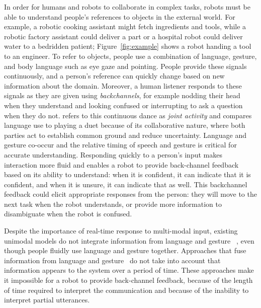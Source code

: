 \documentclass[letterpaper, 10 pt, conference]{ieeeconf}
\begin{document}
In order for humans and robots to collaborate in complex tasks, robots
must be able to understand people's references to objects in the
external world.  For example, a robotic cooking assistant might fetch
ingredients and tools, while a robotic factory assistant could deliver
a part or a hospital robot could deliver water to a bedridden patient;
Figure~\ref{fig:example} shows a robot handing a tool to an engineer.
To refer to objects, people use a combination of language, gesture,
and body language such as eye gaze and pointing.  People provide these
signals continuously, and a person's reference can quickly change
based on new information about the domain.  Moreover, a human listener
responds to these signals as they are given using {\em backchannels},
for example nodding their head when they understand and looking
confused or interrupting to ask a question when they do not.
\citet{clark96} refers to this continuous dance as {\em joint
  activity} and compares language use to playing a duet because of its
collaborative nature, where both parties act to establish common
ground and reduce uncertainty.  Language and gesture co-occur and the
relative timing of speech and gesture is critical for accurate
understanding.  Responding quickly to a person's input makes
interaction more fluid and enables a robot to provide back-channel
feedback based on its ability to understand: when it is confident, it
can indicate that it is confident, and when it is unsure, it can
indicate that as well.  This backchannel feedback could elicit
appropriate responses from the person: they will move to the next task
when the robot understands, or provide more information to
disambiguate when the robot is confused.


Despite the importance of real-time response to multi-modal input,
existing unimodal models do not integrate information from language
and gesture~\citep{matuszek14, tellex11, kollar10} , even though
people fluidly use language and gesture together.  Approaches that
fuse information from language and gesture~\citep{matuszek14} do not
take into account that information appears to the system over a period
of time.  These approaches make it impossible for a robot to provide
back-channel feedback, because of the length of time required to
interpret the communication and because of the inability to interpret
partial utterances.
\end{document}
